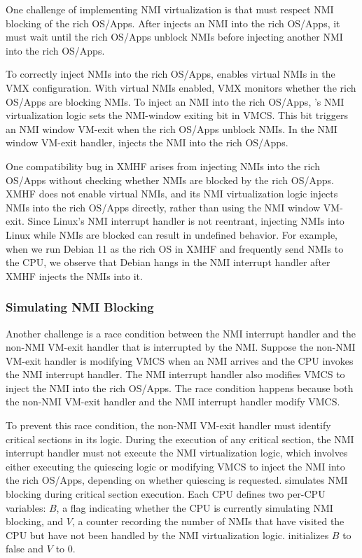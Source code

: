 One challenge of implementing NMI virtualization is that  must respect NMI blocking of the rich OS/Apps. After  injects an NMI into the rich OS/Apps, it must wait until the rich OS/Apps unblock NMIs before injecting another NMI into the rich OS/Apps.

To correctly inject NMIs into the rich OS/Apps,  enables virtual NMIs in the VMX configuration. With virtual NMIs enabled, VMX monitors whether the rich OS/Apps are blocking NMIs. To inject an NMI into the rich OS/Apps, 's NMI virtualization logic sets the NMI-window exiting bit in VMCS. This bit triggers an NMI window VM-exit when the rich OS/Apps unblock NMIs. In the NMI window VM-exit handler,  injects the NMI into the rich OS/Apps.

One compatibility bug in XMHF arises from injecting NMIs into the rich OS/Apps without checking whether NMIs are blocked by the rich OS/Apps. XMHF does not enable virtual NMIs, and its NMI virtualization logic injects NMIs into the rich OS/Apps directly, rather than using the NMI window VM-exit. Since Linux's NMI interrupt handler is not reentrant, injecting NMIs into Linux while NMIs are blocked can result in undefined behavior. For example, when we run Debian 11 as the rich OS in XMHF and frequently send NMIs to the CPU, we observe that Debian hangs in the NMI interrupt handler after XMHF injects the NMIs into it.

\subsubsection{Simulating NMI Blocking}

Another challenge is a race condition between the NMI interrupt handler and the non-NMI VM-exit handler that is interrupted by the NMI. Suppose the non-NMI VM-exit handler is modifying VMCS when an NMI arrives and the CPU invokes the NMI interrupt handler. The NMI interrupt handler also modifies VMCS to inject the NMI into the rich OS/Apps. The race condition happens because both the non-NMI VM-exit handler and the NMI interrupt handler modify VMCS.

To prevent this race condition, the non-NMI VM-exit handler must identify critical sections in its logic. During the execution of any critical section, the NMI interrupt handler must not execute the NMI virtualization logic, which involves either executing the quiescing logic or modifying VMCS to inject the NMI into the rich OS/Apps, depending on whether quiescing is requested.  simulates NMI blocking during critical section execution. Each CPU defines two per-CPU variables: $B$, a flag indicating whether the CPU is currently simulating NMI blocking, and $V$, a counter recording the number of NMIs that have visited the CPU but have not been handled by the NMI virtualization logic.  initializes $B$ to false and $V$ to $0$.

